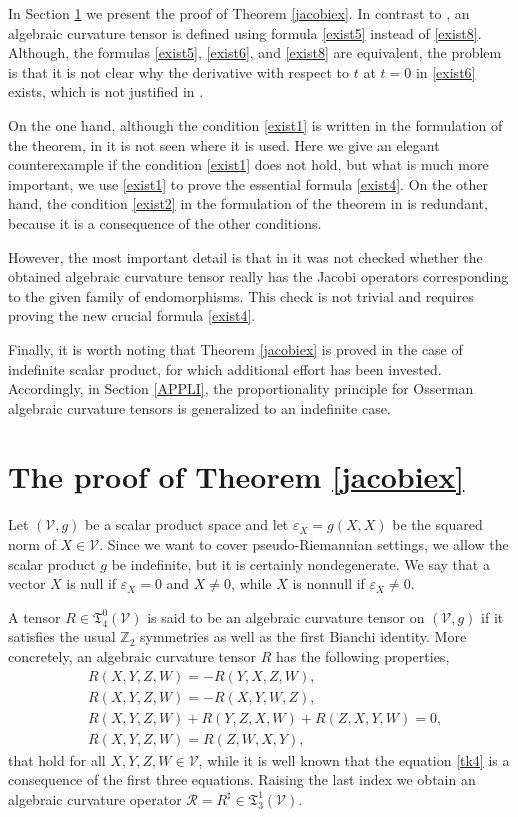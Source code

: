 \documentclass[preprint]{elsarticle}
\newcommand\mc{\mathcal}
\newcommand\mb{\mathbb}
\newcommand\ve{\varepsilon}%
\newcommand\xt{\mathfrak{T}}
\begin{document}
In Section \ref{PROOF1} we present the proof of Theorem \ref{jacobiex}.
In contrast to \cite{A9}, an algebraic curvature tensor is defined using formula \eqref{exist5} instead of \eqref{exist8}.
Although, the formulas \eqref{exist5}, \eqref{exist6}, and \eqref{exist8} are equivalent, 
the problem is that it is not clear why the derivative with respect to $t$ at $t=0$ in \eqref{exist6} exists, which is not justified in \cite{A9}.

On the one hand, although the condition \eqref{exist1} is written in the formulation of the theorem, in \cite{A9} it is not seen where it is used.
Here we give an elegant counterexample if the condition \eqref{exist1} does not hold, 
but what is much more important, we use \eqref{exist1} to prove the essential formula \eqref{exist4}.
On the other hand, the condition \eqref{exist2} in the formulation of the theorem in \cite{A9} is redundant, 
because it is a consequence of the other conditions.

However, the most important detail is that in \cite{A9} it was not checked whether the obtained algebraic curvature tensor really
has the Jacobi operators corresponding to the given family of endomorphisms.
This check is not trivial and requires proving the new crucial formula \eqref{exist4}. 

Finally, it is worth noting that Theorem \ref{jacobiex} is proved in the case of indefinite scalar product,
for which additional effort has been invested.
Accordingly, in Section \ref{APPLI}, the proportionality principle for Osserman algebraic curvature tensors is generalized to an indefinite case.


\section{The proof of Theorem \ref{jacobiex}}\label{PROOF1}

Let $(\mc{V},g)$ be a scalar product space and let $\ve_X=g(X,X)$ be the squared norm of $X\in\mc{V}$.
Since we want to cover pseudo-Riemannian settings, we allow the scalar product $g$ be indefinite, but it is certainly nondegenerate.
We say that a vector $X$ is null if $\ve_X=0$ and $X\neq 0$, while $X$ is nonnull if $\ve_X\neq 0$.

A tensor $R\in\xt^0_4(\mc{V})$ is said to be an {algebraic curvature tensor} on $(\mc{V},g)$ 
if it satisfies the usual $\mb{Z}_2$ symmetries as well as the first Bianchi identity.
More concretely, an algebraic curvature tensor $R$ has the following properties,
\begin{align}
&R(X,Y,Z,W)=-R(Y,X,Z,W),\label{tk1}\\
&R(X,Y,Z,W)=-R(X,Y,W,Z),\label{tk2}\\
&R(X,Y,Z,W)+R(Y,Z,X,W)+R(Z,X,Y,W)=0,\label{tk3}\\
&R(X,Y,Z,W)=R(Z,W,X,Y)\label{tk4},
\end{align}
that hold for all $X,Y,Z,W\in\mc{V}$, while it is well known that the equation \eqref{tk4} is a consequence of the first three equations. 
Raising the last index we obtain an algebraic curvature operator $\mc{R}=R^\sharp\in\xt^1_3(\mc{V})$.
\end{document}
